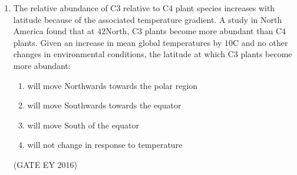\documentclass[journal]{IEEEtran}
\begin{document}
\begin{enumerate}
\item The relative abundance of C3 relative to C4 plant species increases with latitude because of the associated temperature gradient. A study in North America found that at $42$\degree North, C3 plants become more abundant than C4 plants. Given an increase in mean global temperatures by $10$\degree C and no other changes in environmental conditions, the latitude at which C3 plants become more abundant:
\begin{enumerate}
    \item will move Northwards towards the polar region
    \item will move Southwards towards the equator
    \item will move South of the equator
    \item will not change in response to temperature
\end{enumerate}
\hfill{(GATE EY 2016)}

\end{enumerate}
\bigskip
{}
\end{document}
